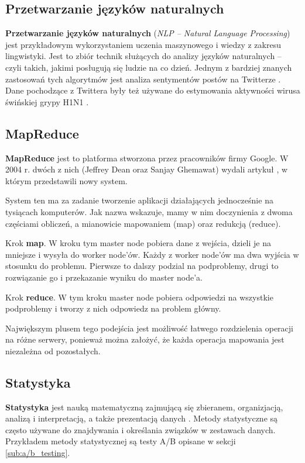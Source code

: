 \documentclass[twocolumn]{svjour3}          %
\begin{document}
\subsection{Przetwarzanie języków naturalnych}
\label{sub:nlp}
\textbf{Przetwarzanie języków naturalnych} (\textit{NLP -- Natural Language Processing}) jest przykładowym wykorzystaniem uczenia maszynowego i wiedzy z zakresu lingwistyki. Jest to zbiór technik służących do analizy języków naturalnych -- czyli takich, jakimi posługują się ludzie na co dzień. Jednym z bardziej znanych zastosowań tych algorytmów jest analiza sentymentów postów na Twitterze \cite{agarwal11}. Dane pochodzące z Twittera były też używane do estymowania aktywności wirusa świńskiej grypy H1N1 \cite{signorini11}.

\subsection{MapReduce}
\label{sub:mapreduce}
\textbf{MapReduce} jest to platforma stworzona przez pracowników firmy Google.  W 2004 r. dwóch z nich (Jeffrey Dean oraz Sanjay Ghemawat) wydali artykuł \cite{dean08}, w którym przedstawili nowy system. 

System ten ma za zadanie tworzenie aplikacji działających jednocześnie na tysiącach komputerów. Jak nazwa wskazuje, mamy w nim doczynienia z dwoma częściami obliczeń, a mianowicie mapowaniem (map) oraz redukcją (reduce).

Krok \textbf{map}. W kroku tym master node pobiera dane z wejścia, dzieli je na mniejsze i wysyła do worker node'ów. Każdy z worker node'ów ma dwa wyjścia w stosunku do problemu. Pierwsze to dalszy podzial na podproblemy, drugi to rozwiązanie go i przekazanie wyniku do master node'a.

Krok \textbf{reduce}. W tym kroku master node pobiera odpowiedzi na wszystkie podproblemy i tworzy z nich odpowiedz na problem główny. 

Największym plusem tego podejścia jest możliwość łatwego rozdzielenia operacji na różne serwery, ponieważ można założyć, że każda operacja mapowania jest niezależna od pozostałych.

\subsection{Statystyka}
\label{sub:statystyka}
\textbf{Statystyka} jest nauką matematyczną zajmującą się zbieranem, organizjacją, analizą i interpretacją, a także prezentacją danych \cite{statystyka:podrecznik}. Metody statystyczne są często używane do znajdywania i określania związków w zestawach danych. Przykładem metody statystycznej są testy A/B opisane w sekcji \ref{sub:a/b_testing}.
\end{document}
